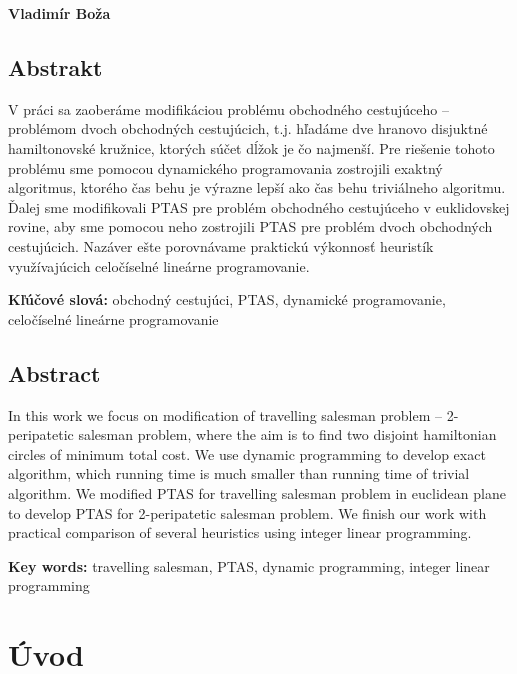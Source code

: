 \documentclass[12pt,a4paper]{book}
\begin{document}
\hfill{\bf Vladimír Boža}
\eject %


\thispagestyle{empty}

\section*{Abstrakt}

V práci sa zaoberáme modifikáciou problému obchodného cestujúceho --
problémom dvoch obchodných cestujúcich, t.j. hľadáme dve hranovo
disjuktné hamiltonovské kružnice, ktorých súčet dĺžok je čo najmenší.
Pre riešenie tohoto problému sme pomocou dynamického programovania
zostrojili exaktný algoritmus, ktorého čas behu je výrazne lepší ako
čas behu triviálneho algoritmu. Ďalej sme modifikovali PTAS pre problém
obchodného cestujúceho v euklidovskej rovine, aby sme pomocou neho zostrojili PTAS pre
problém dvoch obchodných cestujúcich.
Nazáver ešte porovnávame praktickú výkonnosť heuristík využívajúcich
celočíselné lineárne programovanie. 

\medskip
{\bf Kľúčové slová:} obchodný cestujúci, PTAS, dynamické programovanie, celočíselné
lineárne programovanie
\eject

\thispagestyle{empty}

\section*{Abstract}

In this work we focus on modification of travelling salesman problem --
2-peripatetic salesman problem, where the aim is to find two disjoint
hamiltonian circles of minimum total cost.
We use dynamic programming to develop exact algorithm, which running time is
much smaller than running time of trivial algorithm. We modified PTAS for
travelling salesman problem in euclidean plane to develop PTAS for
2-peripatetic salesman problem. 
We finish our work with practical comparison of several heuristics
using integer linear programming.

\medskip
{\bf Key words:} travelling salesman, PTAS, dynamic programming,
integer linear programming
\eject

\thispagestyle{empty}
\tableofcontents
\thispagestyle{empty}

\setcounter{page}{0}
\chapter*{Úvod}
\label{chapter:uvod}

\end{document}
